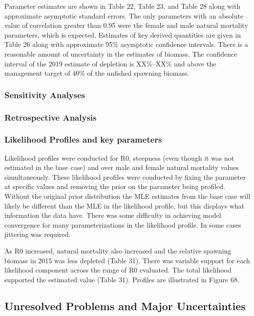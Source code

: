 \documentclass[
]{scrartcl}
\begin{document}
Parameter estimates are shown in Table 22, Table 23, and Table 28 along
with approximate asymptotic standard errors. The only parameters with an
absolute value of correlation greater than 0.95 were the female and male
natural mortality parameters, which is expected. Estimates of key
derived quantities are given in Table 26 along with approximate 95\%
asymptotic confidence intervals. There is a reasonable amount of
uncertainty in the estimates of biomass. The confidence interval of the
2019 estimate of depletion is XX\%--XX\% and above the management target
of 40\% of the unfished spawning biomass.

\subsubsection{Sensitivity Analyses}\label{sensitivity-analyses}

\subsubsection{Retrospective Analysis}\label{retrospective-analysis}

\subsubsection{Likelihood Profiles and key
parameters}\label{likelihood-profiles-and-key-parameters}

Likelihood profiles were conducted for R0, steepness (even though it was
not estimated in the base case) and over male and female natural
mortality values simultaneously. These likelihood profiles were
conducted by fixing the parameter at specific values and removing the
prior on the parameter being profiled. Without the original prior
distribution the MLE estimates from the base case will likely be
different than the MLE in the likelihood profile, but this displays what
information the data have. There was some difficulty in achieving model
convergence for many parameterizations in the likelihood profile. In
some cases jittering was required.

As R0 increased, natural mortality also increased and the relative
spawning biomass in 2015 was less depleted (Table 31). There was
variable support for each likelihood component across the range of R0
evaluated. The total likelihood supported the estimated value (Table
31). Profiles are illustrated in Figure 68.

\subsection{Unresolved Problems and Major
Uncertainties}\label{unresolved-problems-and-major-uncertainties}
\end{document}
